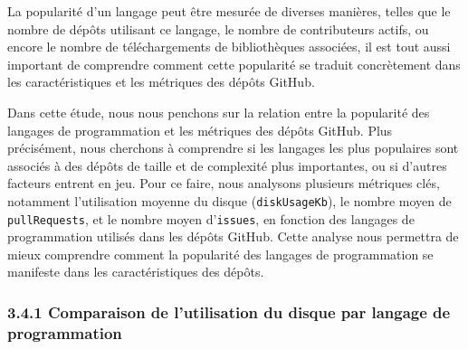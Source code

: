 \documentclass[
]{article}
\begin{document}
La popularité d'un langage peut être mesurée de diverses manières,
telles que le nombre de dépôts utilisant ce langage, le nombre de
contributeurs actifs, ou encore le nombre de téléchargements de
bibliothèques associées, il est tout aussi important de comprendre
comment cette popularité se traduit concrètement dans les
caractéristiques et les métriques des dépôts GitHub.

Dans cette étude, nous nous penchons sur la relation entre la popularité
des langages de programmation et les métriques des dépôts GitHub. Plus
précisément, nous cherchons à comprendre si les langages les plus
populaires sont associés à des dépôts de taille et de complexité plus
importantes, ou si d'autres facteurs entrent en jeu. Pour ce faire, nous
analysons plusieurs métriques clés, notamment l'utilisation moyenne du
disque (\texttt{diskUsageKb}), le nombre moyen de \texttt{pullRequests},
et le nombre moyen d'\texttt{issues}, en fonction des langages de
programmation utilisés dans les dépôts GitHub. Cette analyse nous
permettra de mieux comprendre comment la popularité des langages de
programmation se manifeste dans les caractéristiques des dépôts.

\subsubsection{3.4.1 Comparaison de l'utilisation du disque par langage
de
programmation}\label{comparaison-de-lutilisation-du-disque-par-langage-de-programmation}
\end{document}
